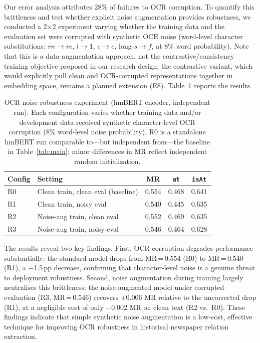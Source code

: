 \documentclass[11pt,a4paper]{article}
\begin{document}
Our error analysis attributes 28\% of failures to OCR corruption. To quantify this brittleness and test whether explicit noise augmentation provides robustness, we conducted a 2$\times$2 experiment varying whether the training data and the evaluation set were corrupted with synthetic OCR noise (word-level character substitutions: $\mathit{rn}\!\to\!m$, $l\!\to\!1$, $c\!\to\!e$, long-$s\!\to\!f$, at 8\% word probability). Note that this is a data-augmentation approach, not the contrastive/consistency training objective proposed in our research design; the contrastive variant, which would explicitly pull clean and OCR-corrupted representations together in embedding space, remains a planned extension (E8). Table~\ref{tab:ocr} reports the results.

\begin{table}[t]
\centering
\caption{OCR noise robustness experiment (hmBERT encoder, independent run). Each configuration varies whether training data and/or development data received synthetic character-level OCR corruption (8\% word-level noise probability). R0 is a standalone hmBERT run comparable to---but independent from---the baseline in Table~\ref{tab:main}; minor differences in MR reflect independent random initialization.}
\label{tab:ocr}
\begin{tabular}{llccc}
\toprule
\textbf{Config} & \textbf{Setting} & \textbf{MR} & \textbf{\texttt{at}} & \textbf{\texttt{isAt}} \\
\midrule
R0 & Clean train, clean eval (baseline) & 0.554 & 0.468 & 0.641 \\
R1 & Clean train, noisy eval            & 0.540 & 0.445 & 0.635 \\
R2 & Noise-aug train, clean eval        & 0.552 & 0.469 & 0.635 \\
R3 & Noise-aug train, noisy eval        & 0.546 & 0.464 & 0.628 \\
\bottomrule
\end{tabular}
\end{table}

The results reveal two key findings. First, OCR corruption degrades performance substantially: the standard model drops from MR\,=\,0.554 (R0) to MR\,=\,0.540 (R1), a $-$1.5\,pp decrease, confirming that character-level noise is a genuine threat to deployment robustness. Second, noise augmentation during training largely neutralises this brittleness: the noise-augmented model under corrupted evaluation (R3, MR\,=\,0.546) recovers +0.006 MR relative to the uncorrected drop (R1), at a negligible cost of only $-$0.002 MR on clean text (R2 vs.\ R0). These findings indicate that simple synthetic noise augmentation is a low-cost, effective technique for improving OCR robustness in historical newspaper relation extraction.
\end{document}
